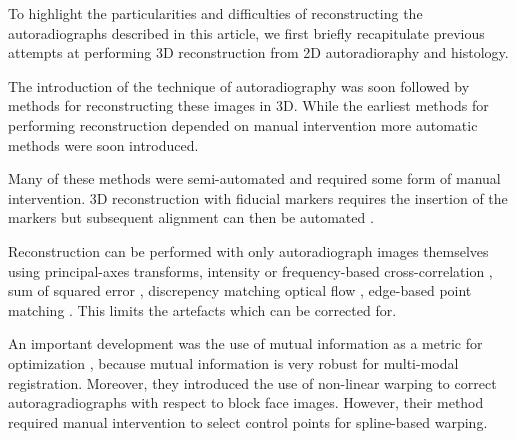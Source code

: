 \documentclass[12pt]{article}
\begin{document}
To highlight the particularities and difficulties of reconstructing the autoradiographs described in this article, we first briefly recapitulate previous attempts at performing 3D reconstruction from 2D autoradioraphy and histology.

The introduction of the technique of autoradiography \cite{Sokoloff1977,Young1979} was soon followed by methods for reconstructing these images in 3D. While the earliest methods for performing reconstruction depended on manual intervention \cite{Hammer1983, Isseroff1983, Stein1984} more automatic methods were soon introduced. 

Many of these methods were semi-automated and required some form of manual intervention. 3D reconstruction with fiducial markers requires the insertion of the markers but subsequent alignment can then be automated \cite{Toga1985, Toga1986, Toga1987}. 

Reconstruction can be performed with only autoradiograph images themselves using principal-axes transforms\cite{Hibbard1984}, intensity or frequency-based cross-correlation \cite{Hibbard1988, Toga1993}, sum of squared error \cite{Andreasen1992}, discrepency matching optical flow \cite{Zhao1993}, edge-based point matching \cite{Rangarajan1997}. This limits the artefacts which can be corrected for. 

An important development was the use of mutual information as a metric for optimization \cite{Kim1997}, because mutual information is very robust for multi-modal registration. Moreover, they introduced the use of non-linear warping to correct autoragradiographs with respect to block face images. However, their method required manual intervention to select control points for spline-based warping.
\end{document}
